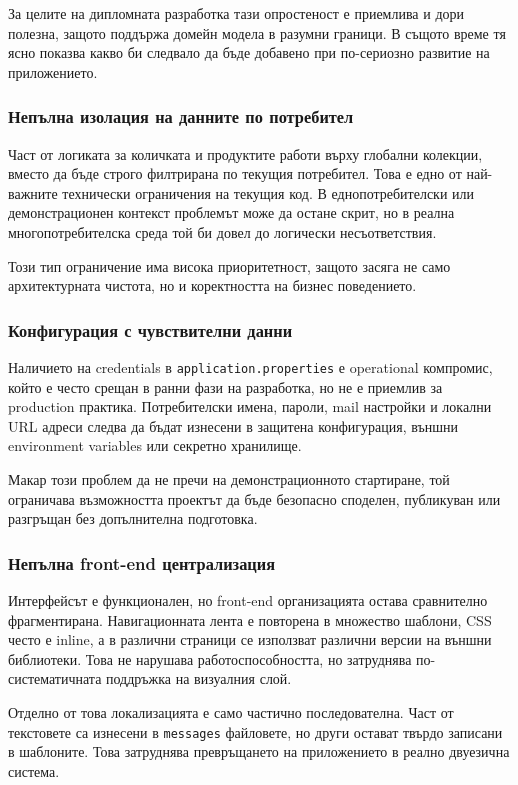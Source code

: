 За целите на дипломната разработка тази опростеност е приемлива и дори полезна, защото поддържа домейн модела в разумни граници. В същото време тя ясно показва какво би следвало да бъде добавено при по-сериозно развитие на приложението.

\subsubsection{Непълна изолация на данните по потребител}

Част от логиката за количката и продуктите работи върху глобални колекции, вместо да бъде строго филтрирана по текущия потребител. Това е едно от най-важните технически ограничения на текущия код. В еднопотребителски или демонстрационен контекст проблемът може да остане скрит, но в реална многопотребителска среда той би довел до логически несъответствия.

Този тип ограничение има висока приоритетност, защото засяга не само архитектурната чистота, но и коректността на бизнес поведението.

\subsubsection{Конфигурация с чувствителни данни}

Наличието на credentials в \texttt{application.properties} е operational компромис, който е често срещан в ранни фази на разработка, но не е приемлив за production практика. Потребителски имена, пароли, mail настройки и локални URL адреси следва да бъдат изнесени в защитена конфигурация, външни environment variables или секретно хранилище.

Макар този проблем да не пречи на демонстрационното стартиране, той ограничава възможността проектът да бъде безопасно споделен, публикуван или разгръщан без допълнителна подготовка.

\subsubsection{Непълна front-end централизация}

Интерфейсът е функционален, но front-end организацията остава сравнително фрагментирана. Навигационната лента е повторена в множество шаблони, CSS често е inline, а в различни страници се използват различни версии на външни библиотеки. Това не нарушава работоспособността, но затруднява по-систематичната поддръжка на визуалния слой.

Отделно от това локализацията е само частично последователна. Част от текстовете са изнесени в \texttt{messages} файловете, но други остават твърдо записани в шаблоните. Това затруднява превръщането на приложението в реално двуезична система.

